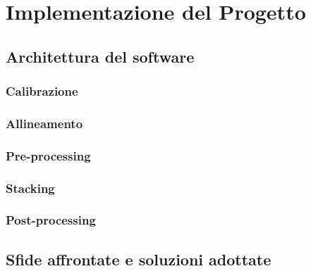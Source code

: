 \chapter{Implementazione del Progetto} \label{chap:implementation}

\section{Architettura del software} \label{sec:architecture}

\subsection{Calibrazione} \label{subsec:calibration_impl}

\subsection{Allineamento} \label{subsec:alignment_impl}

\subsection{Pre-processing} \label{subsec:preprocessing_impl}

\subsection{Stacking} \label{subsec:stacking_impl}

\subsection{Post-processing} \label{subsec:postprocess_impl}

\section{Sfide affrontate e soluzioni adottate} \label{sec:challenges}

\cleardoublepage